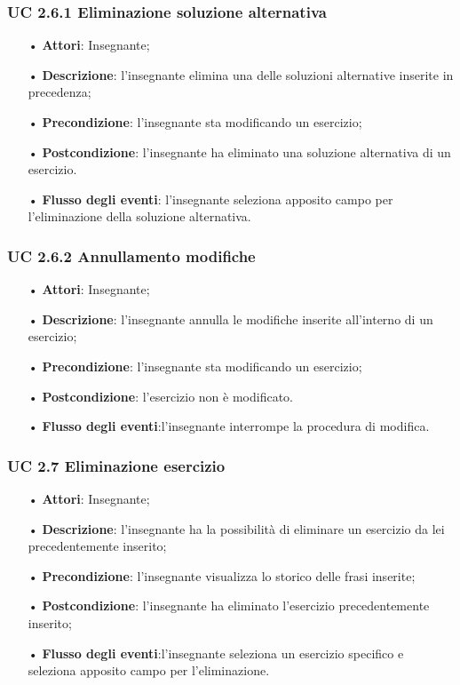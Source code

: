 \subsubsection{UC 2.6.1 Eliminazione soluzione alternativa}
\begin{itemize}
	\item[•] \textbf{Attori}: Insegnante;
	\item[•] \textbf{Descrizione}: l'insegnante elimina una delle soluzioni alternative inserite in precedenza;
	\item[•] \textbf{Precondizione}: l'insegnante sta modificando un esercizio;
	\item[•] \textbf{Postcondizione}: l'insegnante ha eliminato una soluzione alternativa di un esercizio.
	\item[•] \textbf{Flusso degli eventi}: l'insegnante seleziona apposito campo per l'eliminazione della soluzione alternativa.
\end{itemize}

\subsubsection{UC 2.6.2 Annullamento modifiche}
\begin{itemize}
	\item[•] \textbf{Attori}: Insegnante;
	\item[•] \textbf{Descrizione}: l'insegnante annulla le modifiche inserite all'interno di un esercizio; 
	\item[•] \textbf{Precondizione}: l'insegnante sta modificando un esercizio;
	\item[•] \textbf{Postcondizione}: l'esercizio non è modificato.
	\item[•] \textbf{Flusso degli eventi}:l'insegnante interrompe la procedura di modifica.
\end{itemize}

\subsubsection{UC 2.7 Eliminazione esercizio}
\begin{itemize}
	\item[•] \textbf{Attori}: Insegnante;
	\item[•] \textbf{Descrizione}: l'insegnante ha la possibilità di eliminare un esercizio da lei precedentemente inserito;
	\item[•] \textbf{Precondizione}: l'insegnante visualizza lo storico delle frasi inserite;
	\item[•] \textbf{Postcondizione}: l'insegnante ha eliminato l'esercizio precedentemente inserito;
	\item[•] \textbf{Flusso degli eventi}:l'insegnante seleziona un esercizio specifico e seleziona apposito campo per l'eliminazione.
\end{itemize}

